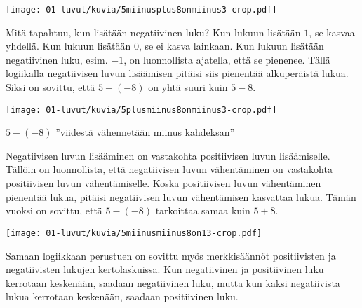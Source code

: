 \vspace{0.3cm}     
    
    \begin{center}
    \texttt{[image: 01-luvut/kuvia/5miinusplus8onmiinus3-crop.pdf]}
    \end{center}


    
    Mitä tapahtuu, kun lisätään negatiivinen luku? Kun lukuun lisätään $1$, se kasvaa yhdellä. Kun lukuun lisätään $0$, se ei kasva lainkaan. Kun lukuun lisätään negatiivinen luku, esim. $-1$, on luonnollista ajatella, että se pienenee. Tällä logiikalla negatiivisen luvun lisäämisen pitäisi siis pienentää alkuperäistä lukua. Siksi on sovittu, että $5+(-8)$ on yhtä suuri kuin $5-8$.
    
\vspace{0.3cm}     

    \begin{center}
    \texttt{[image: 01-luvut/kuvia/5plusmiinus8onmiinus3-crop.pdf]}
    \end{center}
    
    $5-(-8)$ ''viidestä vähennetään miinus kahdeksan''
    
    Negatiivisen luvun lisääminen on vastakohta positiivisen luvun lisäämiselle. Tällöin on luonnollista, että negatiivisen luvun vähentäminen on vastakohta positiivisen luvun vähentämiselle. Koska positiivisen luvun vähentäminen pienentää lukua, pitäisi negatiivisen luvun vähentämisen kasvattaa lukua. Tämän vuoksi on sovittu, että $5-(-8)$ tarkoittaa samaa kuin $5+8$.
    
\vspace{0.3cm}     
        
    \begin{center}
    \texttt{[image: 01-luvut/kuvia/5miinusmiinus8on13-crop.pdf]}
    \end{center}
    
    Samaan logiikkaan perustuen on sovittu myös merkkisäännöt positiivisten ja negatiivisten lukujen kertolaskuissa. Kun negatiivinen ja positiivinen luku kerrotaan keskenään, saadaan negatiivinen luku, mutta kun kaksi negatiivista lukua kerrotaan keskenään, saadaan positiivinen luku.



